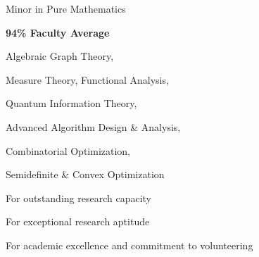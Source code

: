 \documentclass[11pt,a4paper]{altacv}
\begin{document}
\begin{paracol}{2}
\smallskip

Minor in Pure Mathematics

\smallskip

\textbf{94\% Faculty Average}

Algebraic Graph Theory,

Measure Theory, Functional Analysis,

Quantum Information Theory,

Advanced Algorithm Design \& Analysis,

Combinatorial Optimization,

Semidefinite \& Convex Optimization


For outstanding research capacity

\divider\smallskip

For exceptional research aptitude

\divider\smallskip

For academic excellence and commitment to volunteering

\divider\smallskip


\iffalse
\divider\smallskip

\cvevent{President's Scholarship of Distinction}{University of Waterloo}{September 2017}{}
For entrance average above 95\%
\fi

\end{paracol}
\end{document}
